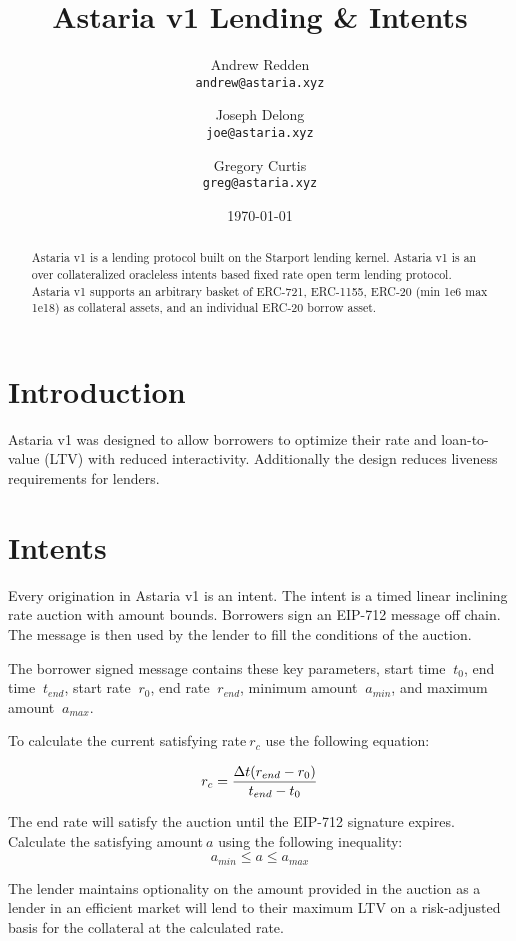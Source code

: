 \documentclass[12pt]{article}
\title{Astaria v1 Lending \& Intents}
\author{Andrew Redden \\ \texttt{andrew@astaria.xyz}
        \and
        Joseph Delong \\ \texttt{joe@astaria.xyz}
        \and
        Gregory Curtis \\ \texttt{greg@astaria.xyz}}
\date{\today}
\begin{document}
\maketitle

\begin{abstract}
Astaria v1 is a lending protocol built on the Starport\cite{starport} lending kernel. Astaria v1 is an over collateralized oracleless intents based fixed rate open term lending protocol.\\

Astaria v1 supports an arbitrary basket of ERC-721\cite{erc721}, ERC-1155\cite{erc1155}, ERC-20\cite{erc20} (min 1e6 max 1e18) as collateral assets, and an individual ERC-20 borrow asset.
\end{abstract}

\section{Introduction}
Astaria v1 was designed to allow borrowers to optimize their rate and loan-to-value (LTV) with reduced interactivity. Additionally the design reduces liveness requirements for lenders. 
\section{Intents}
Every origination in Astaria v1 is an intent. The intent is a timed linear inclining rate auction with amount bounds. Borrowers sign an EIP-712\cite{eip712} message off chain. The message is then used by the lender to fill the conditions of the auction.

The borrower signed message contains these key parameters, start time $\ t_0$, end time $\ t_{end}$, start rate $\ r_0$, end rate $\ r_{end}$, minimum amount $\ a_{min}$, and maximum amount $\ a_{max}$.

To calculate the current satisfying rate$\ r_c$ use the following equation:

$$
r_c=\frac{\Delta t(r_{end}-r_{0}) }{t_{end} - t_{0}} \\
$$


The end rate will satisfy the auction until the EIP-712 signature expires.\\

Calculate the satisfying amount$\ a$ using the following inequality:
$$
a_{min} \le a \le a_{max}
$$

The lender maintains optionality on the amount provided in the auction as a lender in an efficient market will lend to their maximum LTV on a risk-adjusted basis for the collateral at the calculated rate.
\end{document}
